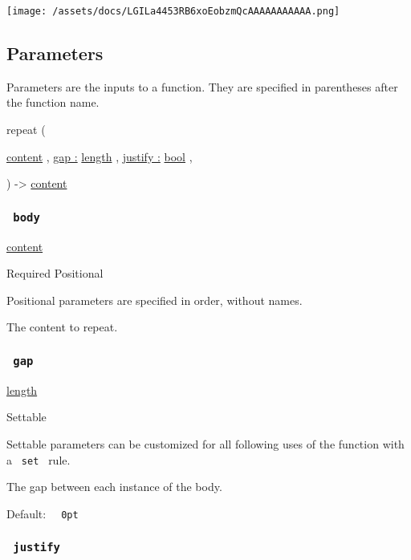 \texttt{[image: /assets/docs/LGILa4453RB6xoEobzmQcAAAAAAAAAAA.png]}

\subsection{\texorpdfstring{{ Parameters
}}{ Parameters }}\label{parameters}

\label{parameters-tooltip}
Parameters are the inputs to a function. They are specified in
parentheses after the function name.

{ repeat } (

{ \href{/docs/reference/foundations/content/}{content} , } {
\hyperref[parameters-gap]{gap :}
\href{/docs/reference/layout/length/}{length} , } {
\hyperref[parameters-justify]{justify :}
\href{/docs/reference/foundations/bool/}{bool} , }

) -\textgreater{} \href{/docs/reference/foundations/content/}{content}

\subsubsection{\texorpdfstring{\texttt{\ body\ }}{ body }}\label{parameters-body}

\href{/docs/reference/foundations/content/}{content}

{Required} {{ Positional }}

\label{parameters-body-positional-tooltip}
Positional parameters are specified in order, without names.

The content to repeat.

\subsubsection{\texorpdfstring{\texttt{\ gap\ }}{ gap }}\label{parameters-gap}

\href{/docs/reference/layout/length/}{length}

{{ Settable }}

\label{parameters-gap-settable-tooltip}
Settable parameters can be customized for all following uses of the
function with a \texttt{\ set\ } rule.

The gap between each instance of the body.

Default: \texttt{\ }{\texttt{\ 0pt\ }}\texttt{\ }

\subsubsection{\texorpdfstring{\texttt{\ justify\ }}{ justify }}\label{parameters-justify}

